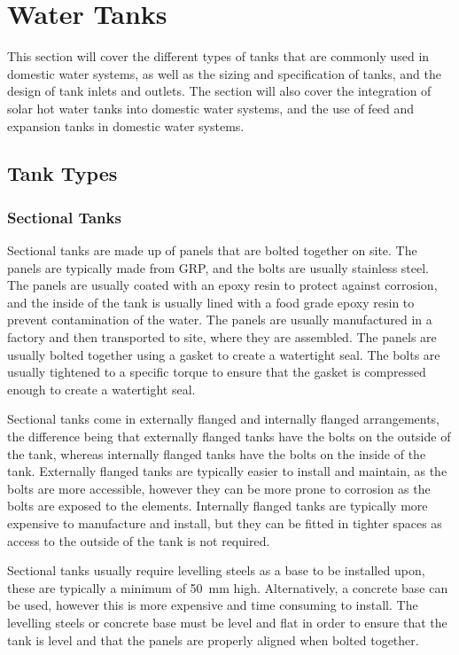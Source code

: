 \chapter{Water Tanks}
\label{chp:tanks}

This section will cover the different types of tanks that are commonly used in domestic water systems, as well as the sizing and specification of tanks, and the design of tank inlets and outlets.  The section will also cover the integration of solar hot water tanks into domestic water systems, and the use of feed and expansion tanks in domestic water systems.

\section{Tank Types}



\subsection{Sectional Tanks}

Sectional tanks are made up of panels that are bolted together on site.  The panels are typically made from \gls{GRP}, and the bolts are usually stainless steel.  The panels are usually coated with an epoxy resin to protect against corrosion, and the inside of the tank is usually lined with a food grade epoxy resin to prevent contamination of the water. The panels are usually manufactured in a factory and then transported to site, where they are assembled.  The panels are usually bolted together using a gasket to create a watertight seal.  The bolts are usually tightened to a specific torque to ensure that the gasket is compressed enough to create a watertight seal.

Sectional tanks come in externally flanged and internally flanged arrangements, the difference being that externally flanged tanks have the bolts on the outside of the tank, whereas internally flanged tanks have the bolts on the inside of the tank.  Externally flanged tanks are typically easier to install and maintain, as the bolts are more accessible, however they can be more prone to corrosion as the bolts are exposed to the elements.  Internally flanged tanks are typically more expensive to manufacture and install, but they can be fitted in tighter spaces as access to the outside of the tank is not required.

Sectional tanks usually require levelling steels as a base to be installed upon, these are typically a minimum of \SI{50}{\milli\metre} high. Alternatively, a concrete base can be used, however this is more expensive and time consuming to install.  The levelling steels or concrete base must be level and flat in order to ensure that the tank is level and that the panels are properly aligned when bolted together.


